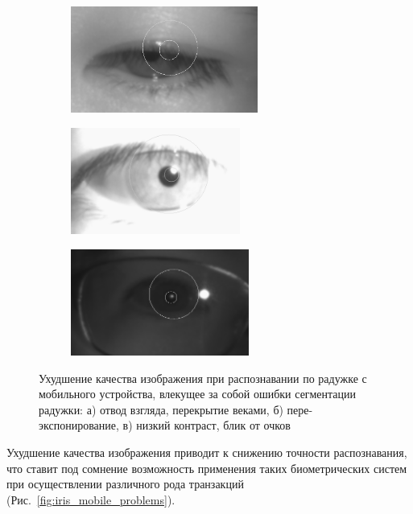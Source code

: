 \begin{figure}[!h]
	\begin{subfigure}{.33\textwidth}
		\centering
		\includegraphics[width=0.95\columnwidth,height=3.5cm]{pictures/gaze-away-occlusion.png}
		\caption{}
		\label{fig:gaze_away_occlusion}
	\end{subfigure}%
	\begin{subfigure}{.33\textwidth}
		\centering
		\includegraphics[width=0.95\columnwidth,height=3.5cm]{pictures/over-exposure.png}
		\caption{}
		\label{fig:over_exposure}
	\end{subfigure}%
	\begin{subfigure}{.33\textwidth}
		\centering
		\includegraphics[width=0.95\columnwidth,height=3.5cm]{pictures/poor-contrast.png}
		\caption{}
		\label{fig:poor_contrast}
	\end{subfigure}%
	\caption{Ухудшение качества изображения при распознавании по радужке с мобильного устройства, влекущее за собой ошибки сегментации радужки: а) отвод взгляда, перекрытие веками, б) пере-экспонирование, в) низкий контраст, блик от очков}
	\label{fig:iris_iamge_quality_degradation}
\end{figure}

Ухудшение качества изображения приводит к снижению точности распознавания, что ставит под сомнение возможность применения таких биометрических систем при осуществлении различного рода транзакций (Рис.~\ref{fig:iris_mobile_problems}).

